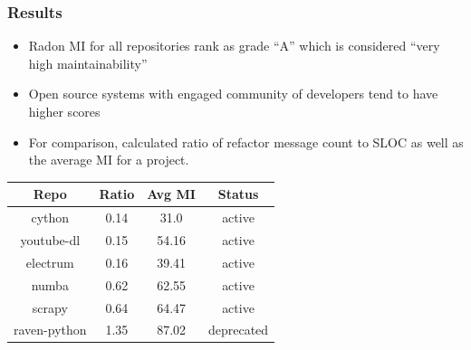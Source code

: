 \documentclass{beamer}
\begin{document}

\begin{frame}
  \frametitle{Results}
  \begin{itemize}
    \item Radon MI for all repositories rank as grade ``A''
    \newline which is considered ``very high maintainability''
    \item Open source systems with engaged community 
    \newline of developers tend to have higher scores
    \item For comparison, calculated ratio of refactor message count 
    \newline to SLOC as well as the average MI for a project.
  \end{itemize}

  \vspace{0.25cm}
  \begin{center}
    \begin{tabular}{ c c c c }
      \textbf{Repo} & \textbf{Ratio} & \textbf{Avg MI} & \textbf{Status} \\ 
      \hline\hline
      cython & 0.14 & 31.0 & active \\ \hline  %
      youtube-dl & 0.15 & 54.16 & active \\ \hline  %
      electrum & 0.16 & 39.41 & active \\ \hline  %
      \hline
      numba & 0.62 & 62.55 & active \\ \hline  %
      scrapy & 0.64 & 64.47 & active \\ \hline  %
      raven-python & 1.35 & 87.02 & deprecated \\ \hline  %
    \end{tabular}
  \end{center}
\end{frame}
\end{document}
